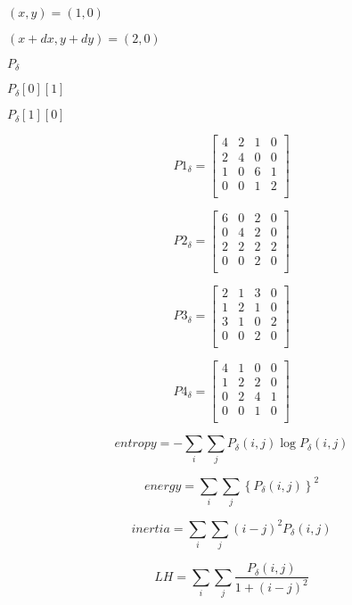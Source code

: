 \documentclass{article}
\begin{document}
{$(x,y)=(1,0)$
\pagebreak

$(x+dx,y +dy)=(2,0)$
\pagebreak

$ P_{\delta} $
\pagebreak

$ P_{\delta}[0][1] $
\pagebreak

$ P_{\delta}[1][0] $
\pagebreak

\[ P1_{\delta } = \left[ \begin{array}{cccc} 4 & 2 & 1 & 0 \\ 2 & 4 & 0 & 0 \\ 1 & 0 & 6 & 1 \\ 0 & 0 & 1 & 2 \\ \end{array} \right] \]
\pagebreak

\[ P2_{\delta } = \left[ \begin{array}{cccc} 6 & 0 & 2 & 0 \\ 0 & 4 & 2 & 0 \\ 2 & 2 & 2 & 2 \\ 0 & 0 & 2 & 0 \\ \end{array} \right] \]
\pagebreak

\[ P3_{\delta } = \left[ \begin{array}{cccc} 2 & 1 & 3 & 0 \\ 1 & 2 & 1 & 0 \\ 3 & 1 & 0 & 2 \\ 0 & 0 & 2 & 0 \\ \end{array} \right] \]
\pagebreak

\[ P4_{\delta } = \left[ \begin{array}{cccc} 4 & 1 & 0 & 0 \\ 1 & 2 & 2 & 0 \\ 0 & 2 & 4 & 1 \\ 0 & 0 & 1 & 0 \\ \end{array} \right] \]
\pagebreak

\[ entropy = - \sum_{i} \sum_{j} P_{\delta }\left(i,j\right)\log P_{\delta }\left(i,j\right) \]
\pagebreak

\[ energy = \sum_{i} \sum_{j} \left\{P_{\delta }\left(i,j\right) \right\}^{2} \]
\pagebreak

\[ inertia = \sum_{i} \sum_{j}\left(i-j\right)^{2}P_{\delta }\left(i,j\right) \]
\pagebreak

\[ LH = \sum_{i} \sum_{j} \frac{P_{\delta }\left(i,j\right)}{1+\left(i-j\right)^{2}} \]
\pagebreak

}
\end{document}
